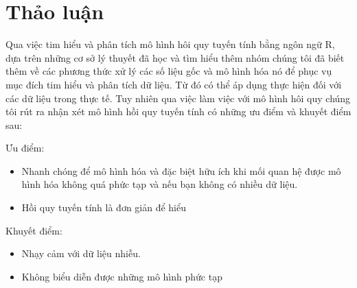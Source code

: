 \section{Thảo luận}
Qua việc tim hiểu và phân tích mô hình hôi quy tuyến tính bằng ngôn ngữ R, dựa trên những cơ sở lý thuyết đã học và tìm hiểu thêm nhóm chúng tôi đã biết thêm về các phương thức xử lý các số liệu gốc và mô hình hóa nó để phục vụ mục đích tim hiểu và phân tích dữ liệu. Từ đó có thể áp dụng thực hiện đối với các dữ liệu trong thực tế. Tuy nhiên qua việc làm việc với mô hình hôi quy chúng tôi rút ra nhận xét mô hình hồi quy tuyến tính có những ưu điểm và khuyết điểm sau:

Ưu điểm:
\begin{itemize}
    \item Nhanh chóng để mô hình hóa và đặc biệt hữu ích khi mối quan hệ được mô hình hóa không quá phức tạp và nếu bạn không có nhiều dữ liệu.
    \item Hồi quy tuyến tính là đơn giản để hiểu
\end{itemize}

Khuyết điểm:
\begin{itemize}
    \item Nhạy cảm với dữ liệu nhiễu.
    \item Không biểu diễn được những mô hình phức tạp
\end{itemize}